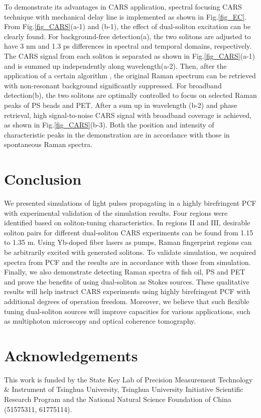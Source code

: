 \documentclass{osa-article}
\begin{document}
To demonstrate its advantages in CARS application, spectral focusing CARS technique with mechanical delay line is implemented as shown in Fig.\ref{fig_EC}. From Fig.\ref{fig_CARS}(a-1) and (b-1), the effect of dual-soliton excitation can be clearly found. For background-free detection(a), the two solitons are adjusted to have 3 nm and 1.3 ps differences in spectral and temporal domains, respectively. The CARS signal from each soliton is separated as shown in Fig.\ref{fig_CARS}(a-1) and is summed up independently along wavelength(a-2). Then, after the application of a certain algorithm \cite{chen_dual-soliton_2016}, the original Raman spectrum can be retrieved with non-resonant background significantly suppressed. For broadband detection(b), the two solitons are optimally controlled to focus on selected Raman peaks of PS beads and PET. After a sum up in wavelength (b-2) and phase retrieval, high signal-to-noise CARS signal with broadband coverage is achieved, as shown in Fig.\ref{fig_CARS}(b-3). Both the position and intensity of characteristic peaks in the demonstration are in accordance with those in spontaneous Raman spectra.  


\section{Conclusion}     

We presented simulations of light pulses propagating in a highly birefringent PCF with experimental validation of the simulation results. Four regions were identified based on soliton-tuning characteristics. In regions II and III, desirable soliton pairs for different dual-soliton CARS experiments can be found from 1.15 to 1.35 \textmu m. Using Yb-doped fiber lasers as pumps, Raman fingerprint regions can be arbitrarily excited with generated solitons. To validate simulation, we acquired spectra from PCF and the results are in accordance with those from simulation. Finally, we also demonstrate detecting Raman spectra of fish oil, PS and PET and prove the benefits of using dual-soliton as Stokes sources. These qualitative results will help instruct CARS experiments using highly birefringent PCF with additional degrees of operation freedom. Moreover, we believe that such flexible tuning dual-soliton sources will improve capacities for various applications, such as multiphoton microscopy and optical coherence tomography\cite{ArteagaSierra.2014}.

\section*{Acknowledgements}
This work is funded by the State Key Lab of Precision Measurement Technology \& Instrument of Tsinghua University, Tsinghua University Initiative Scientific Research Program and the National Natural Science Foundation of China (51575311, 61775114). 




\end{document}
